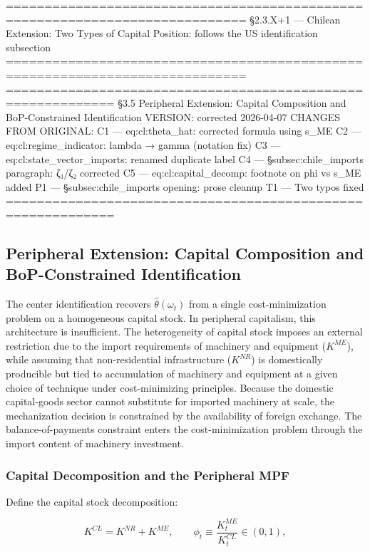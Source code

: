 \documentclass[11pt,a4paper]{article}
\begin{document}
{ =============================================================================
 §2.3.X+1 — Chilean Extension: Two Types of Capital
 Position: follows the US identification subsection
 =============================================================================
 ============================================================
 §3.5 Peripheral Extension: Capital Composition and
       BoP-Constrained Identification
 VERSION: corrected 2026-04-07
 CHANGES FROM ORIGINAL:
   C1 — eq:cl:theta_hat: corrected formula using s_ME
   C2 — eq:cl:regime_indicator: lambda → gamma (notation fix)
   C3 — eq:cl:state_vector_imports: renamed duplicate label
   C4 — §subsec:chile_imports paragraph: ζ₁/ζ₂ corrected
   C5 — eq:cl:capital_decomp: footnote on phi vs s_ME added
   P1 — §subsec:chile_imports opening: prose cleanup
   T1 — Two typos fixed
 ============================================================

\subsection{Peripheral Extension: Capital Composition and
	BoP-Constrained Identification}
\label{subsec:theta_identification_chile}

The center identification recovers $\hat{\theta}(\omega_t)$ from a
single cost-minimization problem on a homogeneous capital stock. In
peripheral capitalism, this architecture is insufficient. The
heterogeneity of capital stock imposes an external restriction due to
the import requirements of machinery and equipment ($K^{ME}$), while
assuming that non-residential infrastructure ($K^{NR}$) is domestically
producible but tied to accumulation of machinery and equipment at a
given choice of technique under cost-minimizing principles. Because the
domestic capital-goods sector cannot substitute for imported machinery
at scale, the mechanization decision is constrained by the availability
of foreign exchange. The balance-of-payments constraint enters the
cost-minimization problem through the import content of machinery
investment.

\subsubsection{Capital Decomposition and the Peripheral MPF}
\label{subsec:chile_mpf}

Define the capital stock decomposition:

\begin{equation}
	K^{CL} = K^{NR} + K^{ME},
	\qquad
	\phi_t \equiv \frac{K_t^{ME}}{K_t^{CL}} \in (0,1),
	\label{eq:cl:capital_decomp}
\end{equation}

}
\end{document}
